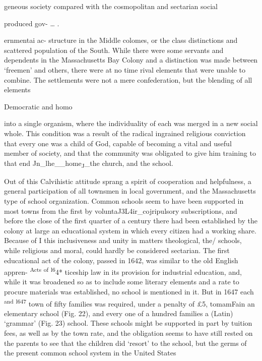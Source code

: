 \documentclass[]{book}
\begin{document}
geneous society compared with the cosmopolitan and sectarian social

produced gov- \ldots{} .

ernmentai ac- structure in the Middle colomes, or the class distinctions and scattered population of the South. While there were some servants and dependents in the Massachusetts Bay Colony and a distinction was made between `freemen' and others, there were at no time rival elements that were unable to combine. The settlements were not a mere confederation, but the blending of all elements

Democratic and homo

into a single organism, where the individuality of each was merged in a new social whole. This condition was a result of the radical ingrained religious conviction that every one was a child of God, capable of becoming a vital and useful member of society, and that the community was obligated to give him training to that end Jn\_lhe\_\_home\textsubscript{J\textbar{}}\_the church, and the school.

Out of this Calvihistic attitude sprang a spirit of cooperation and helpfulness, a general participation of all townsmen in local government, and the Massachusetts type of school organization. Common schools seem to have been supported in most towns from the first by voluntaJ3L4ir\_cojripulsory subscriptions, and before the close of the first quarter of a century there had been established by the colony at large an educational system in which every citizen had a working share. Because of I this inclusiveness and unity in matters theological, the/ schools, while religious and moral, could hardly be considered sectarian. The first educational act of the colony, passed in 1642, was similar to the old English appren- \textsuperscript{Acts} \textsuperscript{of} \textsuperscript{l6}4* ticeship law in its provision for industrial education, and, while it was broadened so as to include some literary elements and a rate to procure materials was established, no school is mentioned in it. But in 1647 each \textsuperscript{and} \textsuperscript{l647} town of fifty families was required, under a penalty of £5, tomamFain an elementary school (Fig. 22), and every one of a hundred families a (Latin) `grammar' (Fig. 23) school. These schools might be supported in part by tuition fees, as well as by the town rate, and the obligation seems to have still rested on the parents to see that the children did `resort' to the school, but the germs of the present common school system in the United States
\end{document}
